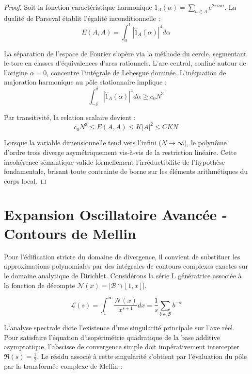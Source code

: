 \documentclass[11pt,a4paper]{article}
\begin{document}
\begin{proof}
Soit la fonction caractéristique harmonique $\hat{1}_A(\alpha) = \sum_{a \in A} e^{2\pi i a \alpha}$. La dualité de Parseval établit l'égalité inconditionnelle :
\begin{equation}
E(A, A) = \int_{0}^{1} |\hat{1}_A(\alpha)|^4 d\alpha
\end{equation}

La séparation de l'espace de Fourier s'opère via la méthode du cercle, segmentant le tore en classes d'équivalences d'arcs rationnels. L'arc central, confiné autour de l'origine $\alpha = 0$, concentre l'intégrale de Lebesgue dominée.
L'inéquation de majoration harmonique au pôle stationnaire implique :
\begin{equation}
\int_{-\delta}^{\delta} |\hat{1}_A(\alpha)|^4 d\alpha \ge c_0 N^3
\end{equation}

Par transitivité, la relation scalaire devient :
\begin{equation}
c_0 N^3 \le E(A, A) \le K |A|^2 \le C K N
\end{equation}

Lorsque la variable dimensionnelle tend vers l'infini ($N \to \infty$), le polynôme d'ordre trois diverge asymétriquement vis-à-vis de la restriction linéaire. Cette incohérence sémantique valide formellement l'irréductibilité de l'hypothèse fondamentale, brisant toute contrainte de borne sur les éléments arithmétiques du corps local.
\end{proof}

\section{Expansion Oscillatoire Avancée - Contours de Mellin}

Pour l'édification stricte du domaine de divergence, il convient de substituer les approximations polynomiales par des intégrales de contours complexes exactes sur le domaine analytique de Dirichlet.
Considérons la série L génératrice associée à la fonction de décompte $\mathcal{N}(x) = | \mathcal{B} \cap [1, x] |$.

\begin{equation}
\mathcal{L}(s) = \int_{1}^{\infty} \frac{\mathcal{N}(x)}{x^{s+1}} dx = \frac{1}{s} \sum_{b \in \mathcal{B}} b^{-s}
\end{equation}

L'analyse spectrale dicte l'existence d'une singularité principale sur l'axe réel. Pour satisfaire l'équation d'isopérimétrie quadratique de la base additive asymptotique, l'abscisse de convergence simple doit impérativement intercepter $\Re(s) = \frac{1}{2}$.
Le résidu associé à cette singularité s'obtient par l'évaluation du pôle par la transformée complexe de Mellin :
\end{document}
